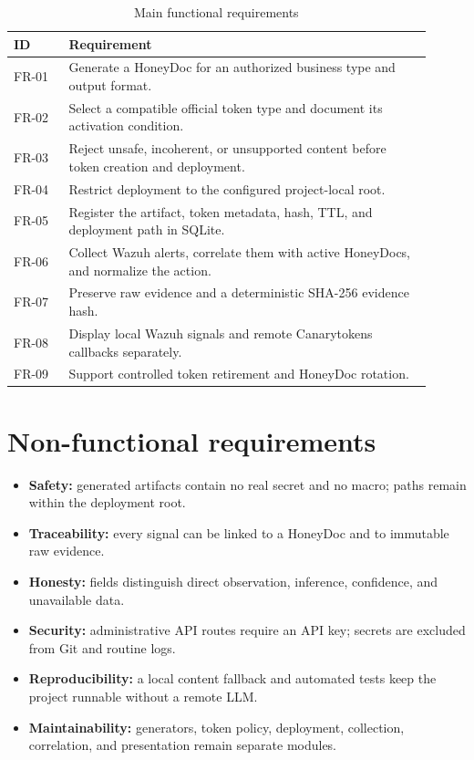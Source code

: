 \begin{table}[H]
\centering
\caption{Main functional requirements}
\label{tab:functional-requirements}
\small
\begin{tabular}{p{0.12\linewidth}p{0.79\linewidth}}
\toprule
ID & Requirement \\
\midrule
FR-01 & Generate a HoneyDoc for an authorized business type and output format. \\
FR-02 & Select a compatible official token type and document its activation condition. \\
FR-03 & Reject unsafe, incoherent, or unsupported content before token creation and deployment. \\
FR-04 & Restrict deployment to the configured project-local root. \\
FR-05 & Register the artifact, token metadata, hash, TTL, and deployment path in SQLite. \\
FR-06 & Collect Wazuh alerts, correlate them with active HoneyDocs, and normalize the action. \\
FR-07 & Preserve raw evidence and a deterministic SHA-256 evidence hash. \\
FR-08 & Display local Wazuh signals and remote Canarytokens callbacks separately. \\
FR-09 & Support controlled token retirement and HoneyDoc rotation. \\
\bottomrule
\end{tabular}
\end{table}

\section{Non-functional requirements}

\begin{itemize}
  \item \textbf{Safety:} generated artifacts contain no real secret and no
  macro; paths remain within the deployment root.
  \item \textbf{Traceability:} every signal can be linked to a HoneyDoc and to
  immutable raw evidence.
  \item \textbf{Honesty:} fields distinguish direct observation, inference,
  confidence, and unavailable data.
  \item \textbf{Security:} administrative API routes require an API key;
  secrets are excluded from Git and routine logs.
  \item \textbf{Reproducibility:} a local content fallback and automated tests
  keep the project runnable without a remote LLM.
  \item \textbf{Maintainability:} generators, token policy, deployment,
  collection, correlation, and presentation remain separate modules.
\end{itemize}

